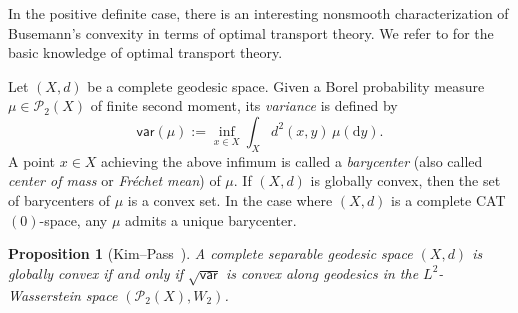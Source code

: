 \documentclass[a4paper,11pt]{article}
\numberwithin{equation}{section}
\theoremstyle{definition}
\theoremstyle{plain}
\newtheorem{proposition}[definition]{Proposition}
\newcommand{\dd}{\mathrm{d}}
\newcommand{\var}{\mathsf{var}}
\newcommand{\cP}{\mathcal{P}}
\begin{document}
In the positive definite case, there is an interesting nonsmooth characterization of Busemann's convexity in terms of optimal transport theory.
We refer to \cite{Vi} for the basic knowledge of optimal transport theory.

Let $(X,d)$ be a complete geodesic space.
Given a Borel probability measure $\mu \in \cP_2(X)$ of finite second moment, its \emph{variance} is defined by
\[ \var(\mu) :=\inf_{x \in X} \int_X d^2(x,y) \,\mu(\dd y). \]
A point $x \in X$ achieving the above infimum is called a \emph{barycenter} (also called \emph{center of mass} or \emph{Fr\'echet mean}) of $\mu$.
If $(X,d)$ is globally convex, then the set of barycenters of $\mu$ is a convex set.
In the case where $(X,d)$ is a complete CAT$(0)$-space, any $\mu$ admits a unique barycenter. 

\begin{proposition}[Kim--Pass~\cite{KP}]\label{pr:var}
A complete separable geodesic space $(X,d)$ is globally convex if and only if $\sqrt{\var}$ is convex along geodesics in the $L^2$-Wasserstein space $(\cP_2(X),W_2)$.
\end{proposition}
\end{document}
